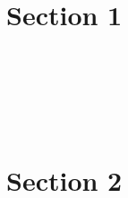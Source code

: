 \documentclass{article}
\begin{document}
​

​\section{Section 1}

​\lipsum[1] %

​

​\section{Section 2}

​\lipsum[2] %

​
\end{document}
